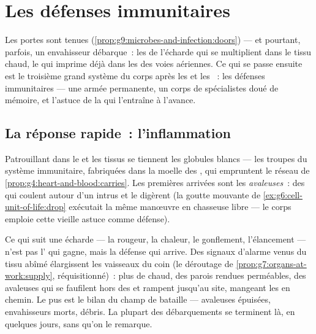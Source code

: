 \chapter{Les défenses immunitaires}\label{ch:g9:immune-defenses}

Les portes sont tenues
(\cref{prop:g9:microbes-and-infection:doors}) --- et
pourtant, parfois, un envahisseur débarque~: les 
de l'écharde qui se multiplient dans le tissu chaud, le
 qui imprime déjà dans les  des voies
aériennes. Ce qui se passe ensuite est le troisième grand
système du corps après les  et les ~: les
défenses immunitaires --- une armée permanente, un corps de
spécialistes doué de mémoire, et l'astuce de la 
qui l'entraîne à l'avance.

\section{La réponse rapide~: l'inflammation}

\begin{definition}\label{def:g9:immune-defenses:standing}
Patrouillant dans le  et les tissus se tiennent les
globules blancs --- les troupes du
système immunitaire, fabriquées dans la moelle des , qui
empruntent le réseau de
\cref{prop:g4:heart-and-blood:carries}. Les premières
arrivées sont les \emph{ avaleuses}~: des 
qui coulent autour d'un intrus et le digèrent (la goutte
mouvante de \cref{ex:g6:cell-unit-of-life:drop} exécutait
la même manœuvre en chasseuse libre --- le corps emploie
cette vieille astuce comme défense).
\end{definition}

\begin{proposition}\label{prop:g9:immune-defenses:inflammation}
Ce qui suit une écharde --- la rougeur, la chaleur, le
gonflement, l'élancement --- n'est pas l' qui
gagne, mais la défense qui arrive. Des signaux d'alarme
venus du tissu abîmé élargissent les vaisseaux du coin (le
déroutage de \cref{prop:g7:organs-at-work:supply},
réquisitionné)~: plus de  chaud, des parois rendues
perméables, des avaleuses qui se faufilent hors des
 et rampent jusqu'au site, mangeant les 
en chemin. Le pus est le bilan du champ de bataille ---
avaleuses épuisées, envahisseurs morts, débris. La plupart
des débarquements se terminent là, en quelques jours, sans
qu'on le remarque.
\end{proposition}
\admitted

